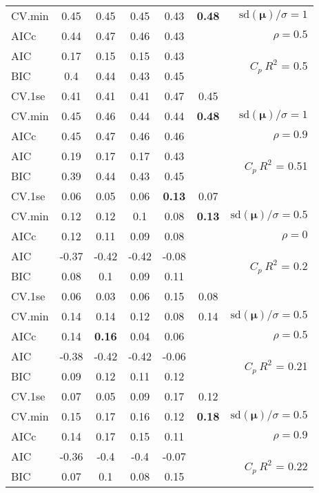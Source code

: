 \documentclass[12pt]{article}
\newcommand{\mr}[1]{\mathrm{#1}}
\newcommand{\bm}[1]{\mathbf{#1}}
\begin{document}
\begin{table}[p]
\begin{center}
\begin{tabular}{l*{5}{c}|r}
CV.min & 0.45 & 0.45 & 0.45 & 0.43 & {\bf 0.48} &  $\mr{sd}(\bm{\mu})/\sigma=1$ \\
AICc & 0.44 & 0.47 & 0.46 & 0.43 & & $\rho=0.5$ \\
AIC & 0.17 & 0.15 & 0.15 & 0.43 & & \multirow{2}{*}{$C_p ~ R^2$ = 0.5} \\
BIC & 0.4 & 0.44 & 0.43 & 0.45 & & \\
 \hline 
CV.1se & 0.41 & 0.41 & 0.41 & 0.47 & 0.45 &\\
CV.min & 0.45 & 0.46 & 0.44 & 0.44 & {\bf 0.48} &  $\mr{sd}(\bm{\mu})/\sigma=1$ \\
AICc & 0.45 & 0.47 & 0.46 & 0.46 & & $\rho=0.9$ \\
AIC & 0.19 & 0.17 & 0.17 & 0.43 & & \multirow{2}{*}{$C_p ~ R^2$ = 0.51} \\
BIC & 0.39 & 0.44 & 0.43 & 0.45 & & \\
 \hline 
CV.1se & 0.06 & 0.05 & 0.06 & {\bf 0.13} & 0.07 &\\
CV.min & 0.12 & 0.12 & 0.1 & 0.08 & {\bf 0.13} &  $\mr{sd}(\bm{\mu})/\sigma=0.5$ \\
AICc & 0.12 & 0.11 & 0.09 & 0.08 & & $\rho=0$ \\
AIC & -0.37 & -0.42 & -0.42 & -0.08 & & \multirow{2}{*}{$C_p ~ R^2$ = 0.2} \\
BIC & 0.08 & 0.1 & 0.09 & 0.11 & & \\
 \hline 
CV.1se & 0.06 & 0.03 & 0.06 & 0.15 & 0.08 &\\
CV.min & 0.14 & 0.14 & 0.12 & 0.08 & 0.14 &  $\mr{sd}(\bm{\mu})/\sigma=0.5$ \\
AICc & 0.14 & {\bf 0.16} & 0.04 & 0.06 & & $\rho=0.5$ \\
AIC & -0.38 & -0.42 & -0.42 & -0.06 & & \multirow{2}{*}{$C_p ~ R^2$ = 0.21} \\
BIC & 0.09 & 0.12 & 0.11 & 0.12 & & \\
 \hline 
CV.1se & 0.07 & 0.05 & 0.09 & 0.17 & 0.12 &\\
CV.min & 0.15 & 0.17 & 0.16 & 0.12 & {\bf 0.18} &  $\mr{sd}(\bm{\mu})/\sigma=0.5$ \\
AICc & 0.14 & 0.17 & 0.15 & 0.11 & & $\rho=0.9$ \\
AIC & -0.36 & -0.4 & -0.4 & -0.07 & & \multirow{2}{*}{$C_p ~ R^2$ = 0.22} \\
BIC & 0.07 & 0.1 & 0.08 & 0.15 & & \\
 \hline 
\end{tabular}
\end{center}
\vspace{-1cm}
\end{table}
\end{document}
